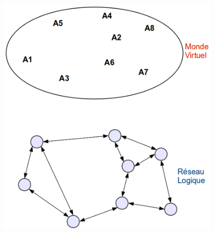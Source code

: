 \documentclass{beamer}
\begin{document}
\begin{frame}
\begin{columns}
\begin{column}{4cm}
\begin{figure}
        \includegraphics[scale=0.1]{./Ressources/Images/OverlayMalle_et2.png}\\
        \label{Propa_Algo}
        \end{figure}
        \end{column}
        \end{columns}
  \end{frame}
\end{document}
